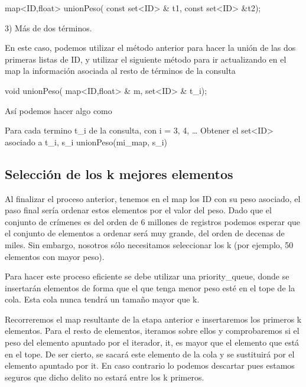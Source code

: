 \begin{DoxyCode}
map<ID,float> unionPeso( \textcolor{keyword}{const} set<ID> & t1, \textcolor{keyword}{const} set<ID> &t2); 
\end{DoxyCode}


\begin{DoxyItemize}
\item 3) Más de dos términos.\end{DoxyItemize}
En este caso, podemos utilizar el método anterior para hacer la unión de las dos primeras listas de I\+D, y utilizar el siguiente método para ir actualizando en el map la información asociada al resto de términos de la consulta 
\begin{DoxyCode}
\textcolor{keywordtype}{void} unionPeso( map<ID,float> & m, set<ID> & t\_i);
\end{DoxyCode}


Así podemos hacer algo como 
\begin{DoxyCode}
Para cada termino t\_i de la consulta, con i = 3, 4, …
   Obtener el set<ID> asociado a t\_i, s\_i
   unionPeso(mi\_map, s\_i)
\end{DoxyCode}
\hypertarget{index_ordenar}{}\subsection{Selección de los k mejores elementos}\label{index_ordenar}
Al finalizar el proceso anterior, tenemos en el map los I\+D con su peso asociado, el paso final sería ordenar estos elementos por el valor del peso. Dado que el conjunto de crímenes es del orden de 6 millones de registros podemos esperar que el conjunto de elementos a ordenar será muy grande, del orden de decenas de miles. Sin embargo, nosotros sólo necesitamos seleccionar los k (por ejemplo, 50 elementos con mayor peso).

Para hacer este proceso eficiente se debe utilizar una priority\+\_\+queue, donde se insertarán elementos de forma que el que tenga menor peso esté en el tope de la cola. Esta cola nunca tendrá un tamaño mayor que k.

Recorreremos el map resultante de la etapa anterior e insertaremos los primeros k elementos. Para el resto de elementos, iteramos sobre ellos y comprobaremos si el peso del elemento apuntado por el iterador, it, es mayor que el elemento que está en el tope. De ser cierto, se sacará este elemento de la cola y se sustituirá por el elemento apuntado por it. En caso contrario lo podemos descartar pues estamos seguros que dicho delito no estará entre los k primeros. 